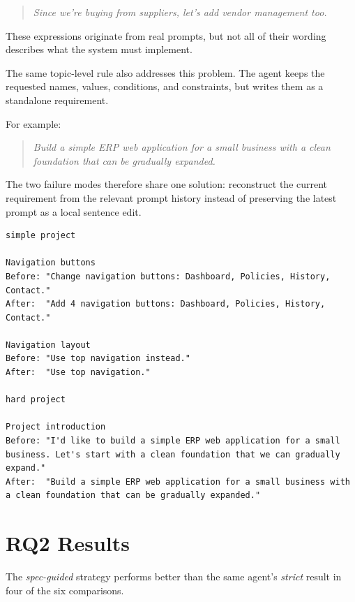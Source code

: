 \begin{quote}
  \emph{Since we're buying from suppliers, let's add vendor management too.}
\end{quote}

These expressions originate from real prompts, but not all of their wording
describes what the system must implement.

The same topic-level rule also addresses this problem. The agent keeps the
requested names, values, conditions, and constraints, but writes them as a
standalone requirement.

For example:

\begin{quote}
  \emph{Build a simple ERP web application for a small business with a clean
  foundation that can be gradually expanded.}
\end{quote}

The two failure modes therefore share one solution: reconstruct the current
requirement from the relevant prompt history instead of preserving the latest
prompt as a local sentence edit.

\begin{lstlisting}[breaklines=true, basicstyle=\small\ttfamily, caption={Examples observed while developing the spec-guided governance instruction.}, label={lst:rq2-governance-examples}]
simple project

Navigation buttons
Before: "Change navigation buttons: Dashboard, Policies, History, Contact."
After:  "Add 4 navigation buttons: Dashboard, Policies, History, Contact."

Navigation layout
Before: "Use top navigation instead."
After:  "Use top navigation."

hard project

Project introduction
Before: "I'd like to build a simple ERP web application for a small business. Let's start with a clean foundation that we can gradually expand."
After:  "Build a simple ERP web application for a small business with a clean foundation that can be gradually expanded."
\end{lstlisting}

\section{RQ2 Results}
\label{sec:rq2-results}

The \emph{spec-guided} strategy performs better than the same agent's
\emph{strict} result in four of the six comparisons.


